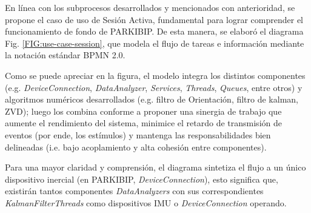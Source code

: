 En línea con los subprocesos desarrollados y mencionados con anterioridad, se propone el caso de uso de Sesión Activa, fundamental para lograr comprender el funcionamiento de fondo de PARKIBIP. De esta manera, se elaboró el diagrama Fig. \ref{FIG:use-case-session}, que modela el flujo de tareas e información mediante la notación estándar BPMN 2.0.

Como se puede apreciar en la figura, el modelo integra los distintos componentes (e.g. \textit{DeviceConnection}, \textit{DataAnalyzer}, \textit{Services}, \textit{Threads}, \textit{Queues}, entre otros) y algoritmos numéricos desarrollados (e.g. filtro de Orientación, filtro de kalman, ZVD); luego los combina conforme a proponer una sinergia de trabajo que aumente el rendimiento del sistema, minimice el retardo de transmisión de eventos (por ende, los estímulos) y mantenga las responsabilidades bien delineadas (i.e. bajo acoplamiento y alta cohesión entre componentes). 

Para una mayor claridad y comprensión, el diagrama sintetiza el flujo a un único dispositivo inercial (en PARKIBIP, \textit{DeviceConnection}), esto significa que, existirán tantos componentes \textit{DataAnalyzers} con sus correspondientes \textit{KalmanFilterThreads} como dispositivos IMU o \textit{DeviceConnection} operando.

\newpage


